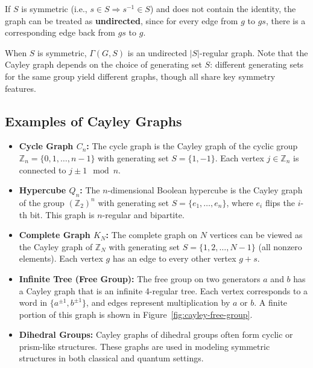 \documentclass[12pt]{report}
\begin{document}
If $S$ is symmetric (i.e., $s \in S \Rightarrow s^{-1} \in S$) and does not contain the identity, the graph can be treated as \textbf{undirected}, since for every edge from $g$ to $gs$, there is a corresponding edge back from $gs$ to $g$.

When $S$ is symmetric, $\Gamma(G, S)$ is an undirected $|S|$-regular graph. Note that the Cayley graph depends on the choice of generating set $S$: different generating sets for the same group yield different graphs, though all share key symmetry features.

\subsection{Examples of Cayley Graphs}

\begin{itemize}
    \item \textbf{Cycle Graph $C_n$:} The cycle graph is the Cayley graph of the cyclic group $\mathbb{Z}_n = \{0, 1, \dots, n-1\}$ with generating set $S = \{1, -1\}$. Each vertex $j \in \mathbb{Z}_n$ is connected to $j \pm 1 \mod n$.

    \item \textbf{Hypercube $Q_n$:} The $n$-dimensional Boolean hypercube is the Cayley graph of the group $(\mathbb{Z}_2)^n$ with generating set $S = \{e_1, \dots, e_n\}$, where $e_i$ flips the $i$-th bit. This graph is $n$-regular and bipartite.

    \item \textbf{Complete Graph $K_N$:} The complete graph on $N$ vertices can be viewed as the Cayley graph of $\mathbb{Z}_N$ with generating set $S = \{1, 2, \dots, N-1\}$ (all nonzero elements). Each vertex $g$ has an edge to every other vertex $g+s$.

    \item \textbf{Infinite Tree (Free Group):} The free group on two generators $a$ and $b$ has a Cayley graph that is an infinite 4-regular tree. Each vertex corresponds to a word in $\{a^{\pm1}, b^{\pm1}\}$, and edges represent multiplication by $a$ or $b$. A finite portion of this graph is shown in Figure~\ref{fig:cayley-free-group}.

    \item \textbf{Dihedral Groups:} Cayley graphs of dihedral groups often form cyclic or prism-like structures. These graphs are used in modeling symmetric structures in both classical and quantum settings.
\end{itemize}
\end{document}

